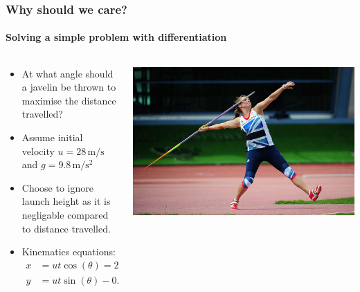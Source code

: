 \documentclass[\beamerclass]{beamer}
\begin{document}
\begin{frame}
\frametitle{Why should we care?}
\framesubtitle{Solving a simple problem with differentiation}

\begin{columns}
\begin{column}{0.65\textwidth}
	\begin{itemize}
		\item<1-> At what angle should a javelin be thrown to maximise the distance travelled?
		\item<2-> Assume initial velocity $u=28\,\si{\meter\per\second}$ and $g=9.8\,\si{\meter\per\second\squared}$
		\item<2-> Choose to ignore launch height as it is negligable compared to distance travelled.
		\item<3-> Kinematics equations:
		\begin{align*}
			x &= u t \cos(\theta) = 28 t \cos(\theta)\\
			y &= u t \sin(\theta) - 0.5 g t^2 = 28 t \sin(\theta) - 4.9 t^2
		\end{align*}
	\end{itemize}
\end{column}
\begin{column}{0.35\textwidth}
	\includegraphics[width=\columnwidth]{javelin}
\end{column}
\end{columns}
\end{frame}
\end{document}
